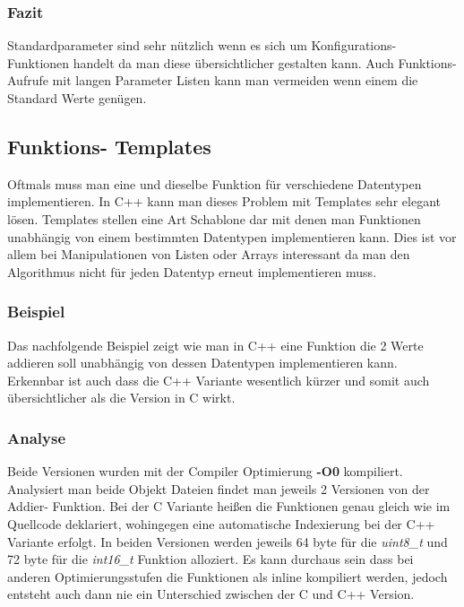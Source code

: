 \documentclass[MES,Master,ngerman]{twbook}%
\begin{document}
\subsubsection{Fazit}
Standardparameter sind sehr nützlich wenn es sich um Konfigurations- Funktionen handelt da man diese übersichtlicher gestalten kann. Auch Funktions- Aufrufe mit langen Parameter Listen kann man vermeiden wenn einem die Standard Werte genügen. 

\newpage

\subsection{Funktions- Templates}
Oftmals muss man eine und dieselbe Funktion für verschiedene Datentypen implementieren. In C++ kann man dieses Problem mit Templates sehr elegant lösen. Templates stellen eine Art Schablone dar mit denen man Funktionen unabhängig von einem bestimmten Datentypen implementieren kann. Dies ist vor allem bei Manipulationen von Listen oder Arrays interessant da man den Algorithmus nicht für jeden Datentyp erneut implementieren muss.

\subsubsection{Beispiel}
Das nachfolgende Beispiel zeigt wie man in C++ eine Funktion die 2 Werte addieren soll unabhängig von dessen Datentypen implementieren kann. Erkennbar ist auch dass die C++ Variante wesentlich kürzer und somit auch übersichtlicher als die Version in C wirkt.
\begin{figure}[!htb]
	\begin{subfigure}[b]{0.5\textwidth}
		
		\label{fig:5}
	\end{subfigure}
	\begin{subfigure}[b]{0.5\textwidth}
		
		\label{fig:6}
	\end{subfigure}
\end{figure}
\subsubsection{Analyse}

Beide Versionen wurden mit der Compiler Optimierung \textbf{-O0} kompiliert. Analysiert man beide Objekt Dateien findet man jeweils 2 Versionen von der Addier- Funktion. Bei der C Variante heißen die Funktionen genau gleich wie im Quellcode deklariert, wohingegen eine automatische Indexierung bei der C++ Variante erfolgt. In beiden Versionen werden jeweils 64 byte für die \textit{uint8\_t} und 72 byte für die \textit{int16\_t} Funktion alloziert. Es kann durchaus sein dass bei anderen Optimierungsstufen die Funktionen als inline kompiliert werden, jedoch entsteht auch dann nie ein Unterschied zwischen der C und C++ Version.
\end{document}
